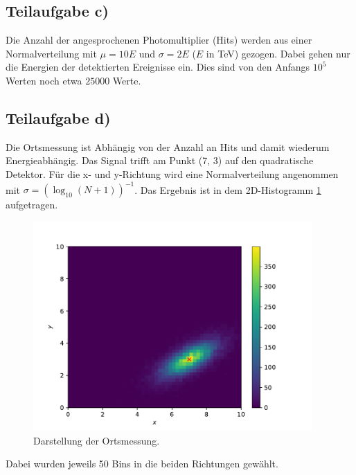 \subsection{Teilaufgabe c)}
Die Anzahl der angesprochenen Photomultiplier (Hits) werden aus einer Normalverteilung
mit $\mu=10 E$ und $\sigma=2 E$ ($E$ in TeV) gezogen. Dabei gehen nur
die Energien der detektierten Ereignisse ein. Dies sind von den Anfangs $10^5$ Werten noch
etwa $25000$ Werte.
\subsection{Teilaufgabe d)}
Die Ortsmessung ist Abhängig von der Anzahl an Hits und damit wiederum Energieabhängig.
Das Signal trifft am Punkt (7, 3) auf den quadratische Detektor. Für die x- und y-Richtung
wird eine Normalverteilung angenommen mit $\sigma=(\log_{10}(N+1))^{-1}$.
Das Ergebnis ist in dem 2D-Histogramm \ref{fig:Ort} aufgetragen.
\begin{figure}[h]
  \centering
  \includegraphics[height = 8cm]{plots/Ort.pdf}
  \caption{Darstellung der Ortsmessung.}
  \label{fig:Ort}
\end{figure}
Dabei wurden jeweils 50 Bins in die beiden Richtungen gewählt.
